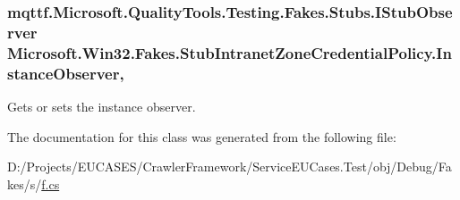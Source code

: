 \hypertarget{class_microsoft_1_1_win32_1_1_fakes_1_1_stub_intranet_zone_credential_policy_a09aa4415b6207726189d253e3d7bac12}{
\subsubsection[{Instance\-Observer}]{\setlength{\rightskip}{0pt plus 5cm}mqttf.\-Microsoft.\-Quality\-Tools.\-Testing.\-Fakes.\-Stubs.\-I\-Stub\-Observer Microsoft.\-Win32.\-Fakes.\-Stub\-Intranet\-Zone\-Credential\-Policy.\-Instance\-Observer\hspace{0.3cm}{\ttfamily [get]}, {\ttfamily [set]}}}\label{class_microsoft_1_1_win32_1_1_fakes_1_1_stub_intranet_zone_credential_policy_a09aa4415b6207726189d253e3d7bac12}


Gets or sets the instance observer.



The documentation for this class was generated from the following file\-:\begin{DoxyCompactItemize}
\item 
D\-:/\-Projects/\-E\-U\-C\-A\-S\-E\-S/\-Crawler\-Framework/\-Service\-E\-U\-Cases.\-Test/obj/\-Debug/\-Fakes/s/\hyperlink{s_2f_8cs}{f.\-cs}\end{DoxyCompactItemize}
